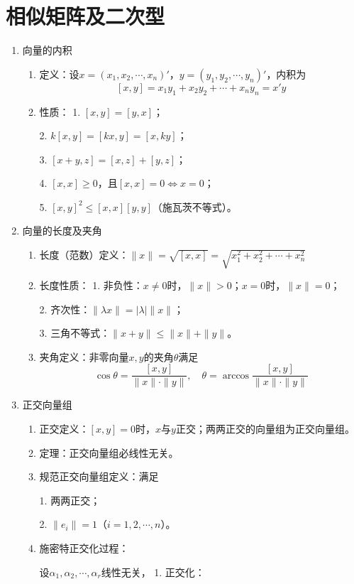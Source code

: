 \documentclass[UTF8]{ctexart}
\theoremstyle{remark}
\begin{document}
\section{相似矩阵及二次型}
\begin{enumerate}
	\item 向量的内积  
	\begin{enumerate}
		\item 定义：设\(x=(x_1,x_2,\cdots,x_n)'\)，\(y=(y_1,y_2,\cdots,y_n)'\)，内积为  
		\[
		[x,y]=x_1y_1+x_2y_2+\cdots+x_ny_n=x'y
		\]  
		\item 性质：  
		1. \([x,y]=[y,x]\)；  
		
		2. \(k[x,y]=[kx,y]=[x,ky]\)；  
		
		3. \([x+y,z]=[x,z]+[y,z]\)；  
		
		4. \([x,x]\geq0\)，且\([x,x]=0\Leftrightarrow x=0\)；  
		
		5. \([x,y]^2\leq[x,x][y,y]\)（施瓦茨不等式）。  
	\end{enumerate}  
	
	\item 向量的长度及夹角  
	\begin{enumerate}
		\item 长度（范数）定义：\(\|x\|=\sqrt{[x,x]}=\sqrt{x_1^2+x_2^2+\cdots+x_n^2}\)  
		\item 长度性质：  
		1. 非负性：\(x\neq0\)时，\(\|x\|>0\)；\(x=0\)时，\(\|x\|=0\)；  
		
		2. 齐次性：\(\|\lambda x\|=|\lambda|\|x\|\)；  
		
		3. 三角不等式：\(\|x+y\|\leq\|x\|+\|y\|\)。  
		\item 夹角定义：非零向量\(x,y\)的夹角\(\theta\)满足  
		\[
		\cos\theta=\frac{[x,y]}{\|x\|\cdot\|y\|}, \quad \theta=\arccos\frac{[x,y]}{\|x\|\cdot\|y\|}
		\]  
	\end{enumerate}  
	
	\item 正交向量组  
	\begin{enumerate}
		\item 正交定义：\([x,y]=0\)时，\(x\)与\(y\)正交；两两正交的向量组为正交向量组。  
		\item 定理：正交向量组必线性无关。  
		\item 规范正交向量组定义：满足  
		
		1. 两两正交；  
		
		2. \(\|e_i\|=1\)（\(i=1,2,\cdots,n\)）。  
		\item 施密特正交化过程：  
		
		设\(\alpha_1,\alpha_2,\cdots,\alpha_r\)线性无关，  
		1. 正交化：  
		

\end{enumerate}
\end{enumerate}
\end{document}
